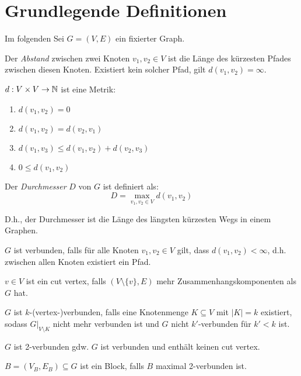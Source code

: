 \chapter{Grundlegende Definitionen}

Im folgenden Sei $ G = (V, E) $ ein fixierter Graph.

\begin{definition}[Abstand]
    Der \textit{Abstand} zwischen zwei Knoten $ v_1, v_2 \in V $ ist die Länge des kürzesten Pfades zwischen diesen Knoten.
    Existiert kein solcher Pfad, gilt $ d(v_1, v_2) = \infty $.
\end{definition}

\begin{observation}
    $ d : V \times V \rightarrow \mathbb{N} $ ist eine Metrik:
    \begin{enumerate}
        \item $ d(v_1, v_2) = 0 $
        \item $ d(v_1, v_2) = d(v_2, v_1) $
        \item $ d(v_1, v_3) \leq d(v_1, v_2) + d(v_2, v_3) $
        \item $ 0 \leq d(v_1, v_2) $
    \end{enumerate}
\end{observation}

\begin{definition}[Durchmesser]
    Der \textit{Durchmesser} $ D $ von $ G $ ist definiert als:
    \begin{equation*}
        D = \max_{v_1, v_2 \in V} d(v_1, v_2)
    \end{equation*}

    D.h., der Durchmesser ist die Länge des längsten kürzesten Wegs in einem Graphen.
\end{definition}

\begin{definition}[Verbundenheit]
    $ G $ ist verbunden, falls für alle Knoten $ v_1, v_2 \in V $ gilt, dass $ d(v_1, v_2) < \infty $, d.h. zwischen allen Knoten existiert ein Pfad.
\end{definition}

\begin{definition}
    $ v \in V $ ist ein cut vertex, falls $ (V \setminus \{ v \}, E) $ mehr Zusammenhangskomponenten als $ G $ hat.
\end{definition}

\begin{definition}
    $ G $ ist $ k $-(vertex-)verbunden, falls eine Knotenmenge $ K \subseteq V $ mit $ |K| = k $ existiert, sodass $ G|_{V \setminus K} $ nicht mehr verbunden ist und $ G $ nicht $ k' $-verbunden für $ k' < k $ ist.
\end{definition}

\begin{proposition}
    $ G $ ist 2-verbunden gdw. $ G $ ist verbunden und enthält keinen cut vertex.
\end{proposition}

\begin{definition}[Block]
    $ B = (V_B, E_B) \subseteq G $ ist ein Block, falls $ B $ maximal 2-verbunden ist.
\end{definition}
